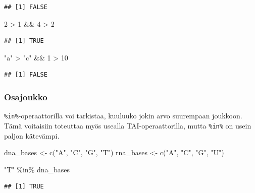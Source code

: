 \documentclass[
]{book}
\newenvironment{Shaded}{\begin{snugshade}}{\end{snugshade}}
\newcommand{\DecValTok}[1]{\textcolor[rgb]{0.00,0.00,0.81}{#1}}
\newcommand{\FunctionTok}[1]{\textcolor[rgb]{0.00,0.00,0.00}{#1}}
\newcommand{\NormalTok}[1]{#1}
\newcommand{\OtherTok}[1]{\textcolor[rgb]{0.56,0.35,0.01}{#1}}
\newcommand{\SpecialCharTok}[1]{\textcolor[rgb]{0.00,0.00,0.00}{#1}}
\newcommand{\StringTok}[1]{\textcolor[rgb]{0.31,0.60,0.02}{#1}}
\begin{document}
\begin{verbatim}
## [1] FALSE
\end{verbatim}

\begin{Shaded}
\begin{Highlighting}[]
\DecValTok{2} \SpecialCharTok{\textgreater{}} \DecValTok{1} \SpecialCharTok{\&\&} \DecValTok{4} \SpecialCharTok{\textgreater{}} \DecValTok{2}
\end{Highlighting}
\end{Shaded}

\begin{verbatim}
## [1] TRUE
\end{verbatim}

\begin{Shaded}
\begin{Highlighting}[]
\StringTok{"a"} \SpecialCharTok{\textgreater{}} \StringTok{"c"} \SpecialCharTok{\&\&} \DecValTok{1} \SpecialCharTok{\textgreater{}} \DecValTok{10}
\end{Highlighting}
\end{Shaded}

\begin{verbatim}
## [1] FALSE
\end{verbatim}

\hypertarget{osajoukko}{%
\subsubsection{Osajoukko}\label{osajoukko}}

\texttt{\%in\%}-operaattorilla voi tarkistaa, kuuluuko jokin arvo suurempaan joukkoon. Tämä voitaisiin toteuttaa myös usealla TAI-operaattorilla, mutta \texttt{\%in\%} on usein paljon kätevämpi.

\begin{Shaded}
\begin{Highlighting}[]
\NormalTok{dna\_bases }\OtherTok{\textless{}{-}} \FunctionTok{c}\NormalTok{(}\StringTok{"A"}\NormalTok{, }\StringTok{"C"}\NormalTok{, }\StringTok{"G"}\NormalTok{, }\StringTok{"T"}\NormalTok{)}
\NormalTok{rna\_bases }\OtherTok{\textless{}{-}} \FunctionTok{c}\NormalTok{(}\StringTok{"A"}\NormalTok{, }\StringTok{"C"}\NormalTok{, }\StringTok{"G"}\NormalTok{, }\StringTok{"U"}\NormalTok{)}

\StringTok{"T"} \SpecialCharTok{\%in\%}\NormalTok{ dna\_bases}
\end{Highlighting}
\end{Shaded}

\begin{verbatim}
## [1] TRUE
\end{verbatim}
\end{document}
